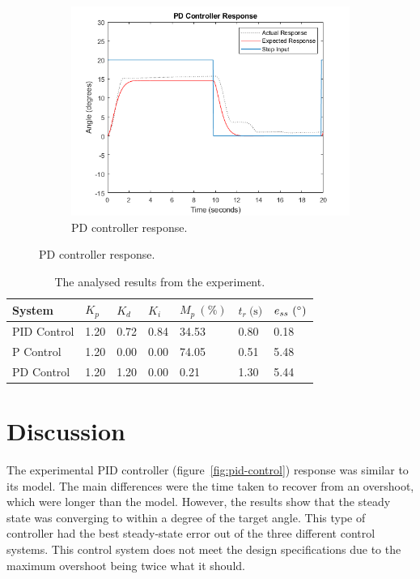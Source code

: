 \documentclass[12pt]{article} %
\begin{document}
\begin{figure}[H]
\begin{subfigure}[b]{0.45\textwidth}
		\includegraphics[width=\textwidth]{pd-control}
		\caption{PD controller response.}
		\label{fig:pd-control}
	\end{subfigure}
\end{figure}

\begin{table}[H]
\centering
\begin{tabular}{|l|l|l|l|l|l|l|}
	\hline
	\textbf{System} & $K_p$ & $K_d$ & $K_i$ & $M_p\ (\%)$ & $t_r\ \textrm{(s)}$ & $e_{ss}\ \textrm{(\degree)}$ \\
	
	\hline
	PID Control & 1.20 & 0.72 & 0.84 & 34.53 & 0.80 & 0.18 \\
	
	\hline
	P Control & 1.20 & 0.00 & 0.00 & 74.05 & 0.51 & 5.48 \\
	
	\hline
	PD Control & 1.20 & 1.20 & 0.00 & 0.21 & 1.30 & 5.44 \\
	
	\hline
\end{tabular}
\caption{The analysed results from the experiment.}
\label{tab:results}
\end{table}

\newpage
\section*{Discussion}


\noindent The experimental PID controller (figure\ \ref{fig:pid-control}) response was similar to its model. The main differences were the time taken to recover from an overshoot, which were longer than the model. However, the results show that the steady state was converging to within a degree of the target angle. This type of controller had the best steady-state error out of the three different control systems. This control system does not meet the design specifications due to the maximum overshoot being twice what it should.
\\
\end{document}
